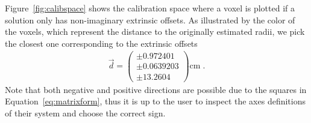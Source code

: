 Figure~\ref{fig:calibspace} shows the calibration space where a voxel is plotted if a solution only has non-imaginary extrinsic offsets.
As illustrated by the color of the voxels, which represent the distance to the originally estimated radii, we pick the closest one corresponding to the extrinsic offsets
\begin{align}
  \vec{d} =
  \begin{pmatrix}
    \pm 0.972401 \\
    \pm 0.0639203 \\
    \pm 13.2604
  \end{pmatrix}\mathrm{cm}\;. \nonumber
\end{align}
Note that both negative and positive directions are possible due to the squares in Equation~\eqref{eq:matrixform}, thus it is up to the user to inspect the axes definitions of their system and choose the correct sign.

 



